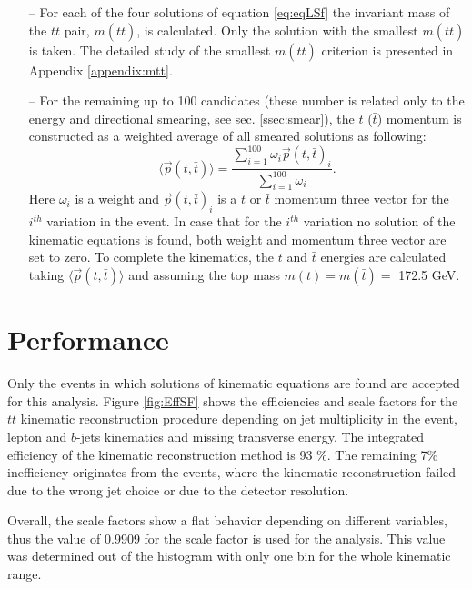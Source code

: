 \begin{itemize}
 \item [--] For each of the four solutions of equation \ref{eq:eqLSf} the invariant mass of the $t\bar{t}$ pair, $m(t\bar{t})$, is calculated. Only
 the solution with the smallest $m(t\bar{t})$ is taken. The detailed study of the smallest $m(t\bar{t})$ criterion is presented in Appendix \ref{appendix:mtt}. 
 \item [--] For the remaining up to 100 candidates (these number is related only to the energy and directional smearing, see sec. \ref{ssec:smear}), the $t$ ($\bar{t}$) 
 momentum is constructed as a weighted average of all smeared solutions as following:
 \begin{equation}
  \langle{\vec{p}(t,\bar{t})}\rangle = \frac{\sum\limits_{i=1}^{100} \omega_{i} \vec{p}(t,\bar{t})_i}{\sum\limits_{i=1}^{100} \omega_i}.
 \end{equation}
 Here $\omega_i$ is a weight and $\vec{p}(t, \bar{t})_{i}$ is a $t$ or $\bar{t}$ momentum three vector for the $i^{th}$ variation in the event. 
 In case that for the $i^{th}$ variation no solution of the kinematic equations is found, both weight and momentum three vector are set to zero. To complete the kinematics,
 the $t$ and $\bar{t}$ energies are calculated taking $\langle{\vec{p}(t,\bar{t})}\rangle$ and assuming the top mass $m(t) = m(\bar{t}) = $ 172.5 GeV.
\end{itemize}

\section{Performance}\label{sec:kinRecPerf}

Only the events in which solutions of kinematic equations are found are accepted for this analysis. 
Figure \ref{fig:EffSF} shows the efficiencies and scale factors for the $t\bar{t}$ kinematic reconstruction procedure depending on jet multiplicity in the event, 
lepton and $b$-jets kinematics and missing transverse energy. The integrated efficiency of the kinematic reconstruction method is 93 $\%$. The remaining 7\%
inefficiency originates from the events, where the kinematic reconstruction failed due to the wrong jet choice or due to the detector resolution.

Overall, the scale factors 
show a flat behavior depending on different variables, thus the value of 0.9909 for the scale factor is used for the analysis. This value was determined 
out of the histogram with only one bin for the whole kinematic range.

